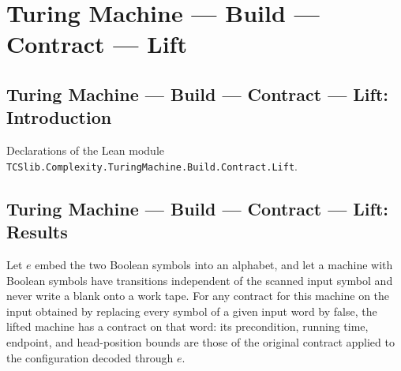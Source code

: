 \section{Turing Machine --- Build --- Contract --- Lift}
\subsection*{Turing Machine --- Build --- Contract --- Lift: Introduction}

Declarations of the Lean module \texttt{TCSlib.Complexity.TuringMachine.Build.Contract.Lift}.

\subsection*{Turing Machine --- Build --- Contract --- Lift: Results}

\begin{definition}
\label{Turing.Contract.liftSymbols}
\leanok
{}
Let $e$ embed the two Boolean symbols into an alphabet, and let a machine with Boolean
symbols have transitions independent of the scanned input symbol and never write a blank
onto a work tape. For any contract for this machine on the input obtained by replacing
every symbol of a given input word by false, the lifted machine has a contract on that
word: its precondition, running time, endpoint, and head-position bounds are those of
the original contract applied to the configuration decoded through $e$.
\end{definition}
